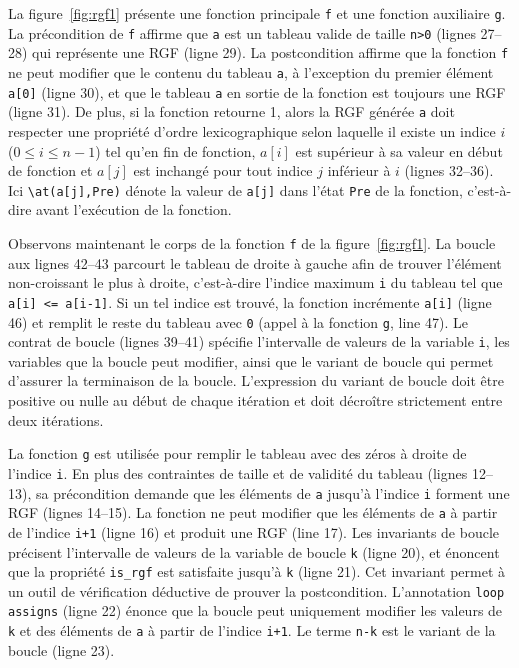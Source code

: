 La figure~\ref{fig:rgf1} présente une fonction principale \lstinline{f} et une
fonction auxiliaire \lstinline{g}.
La précondition de \lstinline{f} affirme que \lstinline{a} est un tableau
valide de taille \lstinline{n>0} (lignes 27--28) qui représente une RGF
(ligne 29).
La postcondition affirme que la fonction \lstinline'f' ne peut modifier que le
contenu du tableau \lstinline{a}, à l'exception du premier élément
\lstinline{a[0]} (ligne 30), et que le tableau \lstinline{a} en sortie de la
fonction est toujours une RGF (ligne 31).
De plus, si la fonction retourne 1, alors la RGF générée \lstinline{a} doit
respecter une propriété d'ordre lexicographique selon laquelle
il existe un indice $i$ ($0 \le i \le n-1$) tel qu'en fin de fonction, $a[i]$
est supérieur à sa valeur en début de fonction et $a[j]$ est inchangé pour tout
indice $j$ inférieur à $i$ (lignes 32--36).
Ici \lstinline{\at(a[j],Pre)} dénote la valeur de \lstinline{a[j]} dans l'état 
\lstinline{Pre} de la fonction, c'est-à-dire avant l'exécution de la fonction.

Observons maintenant le corps de la fonction \lstinline{f} de la
figure~\ref{fig:rgf1}. 
La boucle aux lignes 42--43 parcourt le tableau de droite à gauche afin de
trouver l'élément non-croissant le plus à droite, c'est-à-dire l'indice maximum
\lstinline{i} du tableau tel que \lstinline{a[i] <= a[i-1]}.
Si un tel indice est trouvé, la fonction incrémente \lstinline{a[i]} (ligne 46)
et remplit le reste du tableau avec \lstinline{0} (appel à la fonction
\lstinline{g}, line 47).
Le contrat de boucle (lignes 39--41) spécifie l'intervalle de valeurs de la
variable \lstinline'i', les variables que la boucle peut modifier, ainsi que
le variant de boucle qui permet d'assurer la terminaison de la boucle.
L'expression du variant de boucle doit être positive ou nulle au début de chaque
itération et doit décroître strictement entre deux itérations.

La fonction \lstinline{g} est utilisée pour remplir le tableau avec des zéros
à droite de l'indice \lstinline{i}.
En plus des contraintes de taille et de validité du tableau (lignes 12--13),
sa précondition demande que les éléments de \lstinline{a} jusqu'à l'indice
\lstinline{i} forment une RGF (lignes 14--15).
La fonction ne peut modifier que les éléments de \lstinline{a} à partir de
l'indice \lstinline{i+1} (ligne 16) et produit une RGF (line 17).
Les invariants de boucle précisent l'intervalle de valeurs de la variable de
boucle \lstinline{k} (ligne 20), et énoncent que la propriété \lstinline{is_rgf}
est satisfaite jusqu'à \lstinline{k} (ligne 21).
Cet invariant permet à un outil de vérification déductive de prouver la
postcondition.
L'annotation \lstinline{loop assigns} (ligne 22) énonce que la boucle peut
uniquement modifier les valeurs de \lstinline{k} et des éléments de
\lstinline{a} à partir de l'indice \lstinline{i+1}.
Le terme \lstinline{n-k} est le variant de la boucle (ligne 23).

